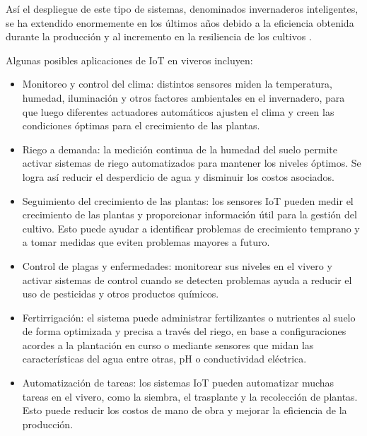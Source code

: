 Así el despliegue de este tipo de sistemas, denominados invernaderos inteligentes, se ha extendido enormemente en los últimos años debido a la eficiencia obtenida durante la producción y al incremento en la resiliencia de los cultivos \citep{agrofacto}. 

\pagebreak 


Algunas posibles aplicaciones de IoT en viveros incluyen:

\begin{itemize}
	\item Monitoreo y control del clima: distintos sensores miden la temperatura, humedad, iluminación y otros factores ambientales en el invernadero, para que luego diferentes actuadores automáticos ajusten el clima y creen las condiciones óptimas para el crecimiento de las plantas.

    \item Riego a demanda: la medición continua de la humedad del suelo permite activar sistemas de riego automatizados para mantener los niveles óptimos. Se logra así reducir el desperdicio de agua y disminuir los costos asociados.

    \item Seguimiento del crecimiento de las plantas: los sensores IoT pueden medir el crecimiento de las plantas y proporcionar información útil para la gestión del cultivo. Esto puede ayudar a identificar problemas de crecimiento temprano y a tomar medidas que eviten problemas mayores a futuro.

    \item Control de plagas y enfermedades: monitorear sus niveles en el vivero y activar sistemas de control cuando se detecten problemas ayuda a reducir el uso de pesticidas y otros productos químicos.
    
   \item  Fertirrigación: el sistema puede administrar fertilizantes o nutrientes al suelo de forma optimizada y precisa a través del riego, en base a configuraciones acordes a la plantación en curso o mediante sensores que midan las características del agua entre otras, pH o conductividad eléctrica.

    \item Automatización de tareas: los sistemas IoT pueden automatizar muchas tareas en el vivero, como la siembra, el trasplante y la recolección de plantas. Esto puede reducir los costos de mano de obra y mejorar la eficiencia de la producción.
\end{itemize}    

